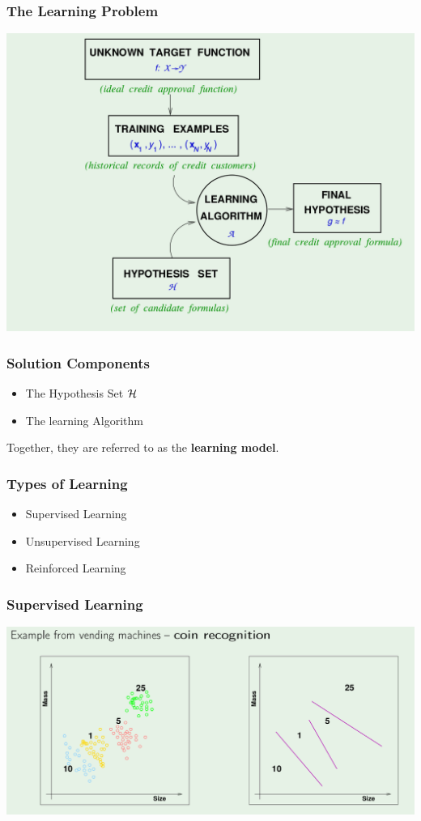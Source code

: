 \documentclass[xcolor=table]{beamer}
\begin{document}
\begin{frame}[t]
\frametitle{The Learning Problem}
\begin{center}
\includegraphics[scale=0.25]{the_learning_problem.png}
\end{center}
\end{frame}

\begin{frame}[t]
\frametitle{Solution Components}
\begin{itemize}
    \item The Hypothesis Set $\cal{H}$
    \item The learning Algorithm
\end{itemize}

Together, they are referred to as the \textbf{learning model}.
\end{frame}

\begin{frame}[t]
\frametitle{Types of Learning}
\begin{itemize}
    \item Supervised Learning
    \item Unsupervised Learning
    \item Reinforced Learning 
\end{itemize}
\end{frame}

\begin{frame}[t]
\frametitle{Supervised Learning}
\begin{center}
\includegraphics[scale=0.22]{supervised_learning.png}
\end{center}
\end{frame}
\end{document}
